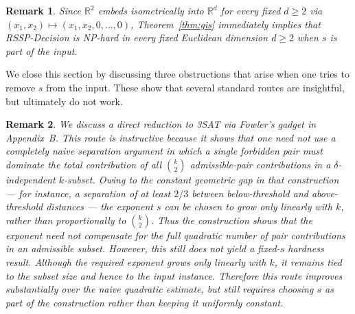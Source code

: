\documentclass[11pt]{article}
\newtheorem{remark}{Remark}
\begin{document}
\begin{remark}
Since $\mathbb{R}^2$ embeds isometrically into $\mathbb{R}^d$ for every fixed
$d\ge 2$ via $(x_1,x_2)\mapsto (x_1,x_2,0,\dots,0)$, Theorem~\ref{thm:gis}
immediately implies that RSSP-Decision is NP-hard in every fixed Euclidean
dimension $d\ge 2$ when $s$ is part of the input.
\end{remark}

We close this section by discussing three obstructions that arise when one tries to remove $s$ from the input. These show that several standard routes are insightful, but ultimately do not work.

\begin{remark}
We discuss a direct reduction to \textsc{3SAT} via Fowler's gadget
\cite{FowlerPatersonTanimoto1981} in Appendix~B. This route is instructive
because it shows that one need not use a completely naive separation argument
in which a single forbidden pair must dominate the total contribution of all
$\binom{k}{2}$ admissible-pair contributions in a $\delta$-independent
$k$-subset. Owing to the constant geometric gap in that construction --- for
instance, a separation of at least $2/3$ between below-threshold and
above-threshold distances --- the exponent $s$ can be chosen to grow only
linearly with $k$, rather than proportionally to $\binom{k}{2}$. Thus the
construction shows that the exponent need not compensate for the full
quadratic number of pair contributions in an admissible subset. However, this
still does not yield a fixed-$s$ hardness result. Although the required
exponent grows only linearly with $k$, it remains tied to the subset size and
hence to the input instance. Therefore this route improves substantially over
the naive quadratic estimate, but still requires choosing $s$ as part of the
construction rather than keeping it uniformly constant.
\end{remark}
\end{document}
